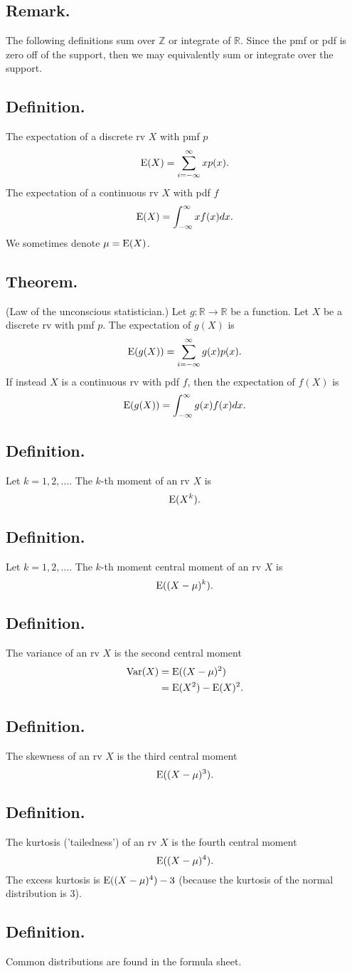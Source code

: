 \documentclass[titlepage]{article}
\begin{document}
\subsection{Remark.} The following definitions sum over $\mathbb{Z}$ or integrate of $\mathbb{R}$. Since the pmf or pdf is zero off of the support, then we may equivalently sum or integrate over the support.

\subsection{Definition.} The expectation of a discrete rv $X$ with pmf $p$
$$\text{E}(X) = \sum_{i=-\infty}^{\infty}xp(x).$$
The expectation of a continuous rv $X$ with pdf $f$
$$\text{E}(X) = \int_{-\infty}^{\infty}xf(x)dx.$$
We sometimes denote $\mu = \text{E}(X)$.

\subsection{Theorem.} (Law of the unconscious statistician.) Let $g: \mathbb{R} \to \mathbb{R}$ be a function. Let $X$ be a discrete rv with pmf $p$. The expectation of $g(X)$ is 
$$\text{E}(g(X)) = \sum_{i=-\infty}^{\infty}g(x)p(x).$$
If instead $X$ is a continuous rv with pdf $f$, then the expectation of $f(X)$ is
$$\text{E}(g(X)) = \int_{-\infty}^{\infty}g(x)f(x)dx.$$

\subsection{Definition.} Let $k = 1, 2, \ldots$. The $k$-th moment of an rv $X$ is 
$$\text{E}(X^{k}).$$

\subsection{Definition.} Let $k = 1, 2, \ldots$. The $k$-th moment central moment of an rv $X$ is 
$$\text{E}((X-\mu)^{k}).$$

\subsection{Definition.} The variance of an rv $X$ is the second central moment 
\begin{align*}
    \text{Var}(X) &= \text{E}((X-\mu)^{2}) \\
            &= \text{E}(X^{2}) - \text{E}(X)^{2}.
\end{align*}

\subsection{Definition.} The skewness of an rv $X$ is the third central moment 
$$\text{E}((X-\mu)^{3}).$$

\subsection{Definition.} The kurtosis ('tailedness') of an rv $X$ is the fourth central moment 
$$\text{E}((X-\mu)^{4}).$$
The excess kurtosis is $\text{E}((X-\mu)^{4}) - 3$ (because the kurtosis of the normal distribution is $3$).

\subsection{Definition.} Common distributions are found in the formula sheet.
\end{document}
